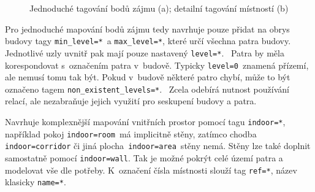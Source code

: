                       \begin{figure}
                    
                    \hfill

                    \caption{Jednoduché tagování bodů zájmu (a); detailní tagování místností (b)\cite{zdroj52}}
                    \label{obr28}
                    \end{figure}
                    

Pro jednoduché mapování bodů zájmu tedy navrhuje pouze přidat na obrys budovy tagy \texttt{min\_level=*}~a \texttt{max\_level=*}, které určí všechna patra budovy. Jednotlivé uzly uvnitř pak mají pouze nastavený \texttt{level=*}. ~Patra by měla korespondovat s~označením patra v~budově. Typicky \texttt{level=0}~znamená přízemí, ale nemusí tomu tak být. Pokud v~budově některé patro chybí, může to být označeno tagem \texttt{non\_existent\_levels=*}. ~Zcela odebírá nutnost používání relací, ale nezabraňuje jejich využití pro seskupení budovy a patra.

Navrhuje komplexnější mapování vnitřních prostor pomocí tagu \texttt{indoor=*}, například pokoj \texttt{indoor=room}~má implicitně stěny, zatímco chodba \\ \texttt{indoor=corridor} či jiná plocha~\texttt{indoor=area}~stěny nemá. Stěny lze také doplnit samostatně pomocí \texttt{indoor=wall}. Tak je možné pokrýt celé území patra a modelovat vše dle potřeby. K~označení čísla místnosti slouží tag \texttt{ref=*}, název klasicky \texttt{name=*}.

